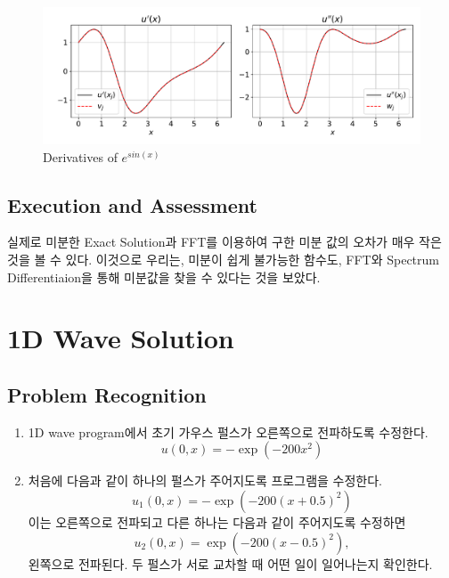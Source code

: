 \documentclass[11pt]{article}
\begin{document}
\begin{figure}[!ht]
  \centering
  \includegraphics[width=1\textwidth]{Differntiation_2.pdf}
  \caption{Derivatives of $e^{sin(x)}$}
\end{figure}

\subsection{Execution and Assessment}
실제로 미분한 Exact Solution과 FFT를 이용하여 구한 미분 값의 오차가 매우 작은 것을 볼 수 있다. 이것으로 우리는, 미분이 쉽게 불가능한 함수도, FFT와 Spectrum Differentiaion을 통해 미분값을 찾을 수 있다는 것을 보았다.

\pagebreak












\section{1D Wave Solution}
\subsection{Problem Recognition} 
\begin{enumerate}
    \item 1D wave program에서 초기 가우스 펄스가 오른쪽으로 전파하도록 수정한다.
\begin{equation}
u(0, x) = -\exp(-200 x^2)
\end{equation}
    \item 처음에 다음과 같이 하나의 펄스가 주어지도록 프로그램을 수정한다.
    \begin{equation}
u_1(0, x) = -\exp(-200 (x + 0.5)^2)
\end{equation}
이는 오른쪽으로 전파되고 다른 하나는 다음과 같이 주어지도록 수정하면
    \begin{equation}
u_2(0, x) = \exp(-200 (x - 0.5)^2),
\end{equation}
왼쪽으로 전파된다. 두 펄스가 서로 교차할 때 어떤 일이 일어나는지 확인한다.
\end{enumerate}
\end{document}
